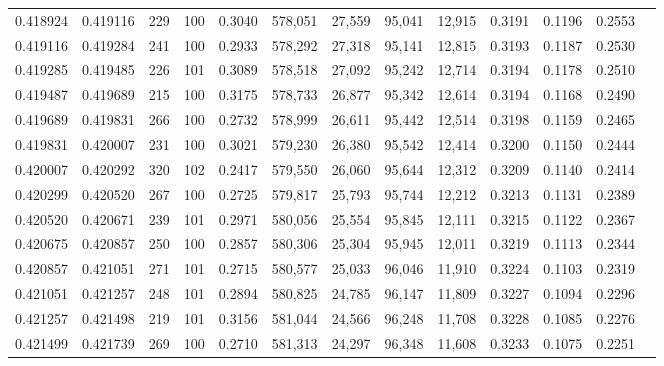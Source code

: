 \begin{tabular}{rrrrrrrrrrrrr}
0.418924 & 0.419116 &   229 & 100 &                                     0.3040 & 578,051 &  27,559 &  95,041 &  12,915 & 0.3191 & 0.1196 & 0.2553 \\
0.419116 & 0.419284 &   241 & 100 &                                     0.2933 & 578,292 &  27,318 &  95,141 &  12,815 & 0.3193 & 0.1187 & 0.2530 \\
0.419285 & 0.419485 &   226 & 101 &                                     0.3089 & 578,518 &  27,092 &  95,242 &  12,714 & 0.3194 & 0.1178 & 0.2510 \\
0.419487 & 0.419689 &   215 & 100 &                                     0.3175 & 578,733 &  26,877 &  95,342 &  12,614 & 0.3194 & 0.1168 & 0.2490 \\
0.419689 & 0.419831 &   266 & 100 &                                     0.2732 & 578,999 &  26,611 &  95,442 &  12,514 & 0.3198 & 0.1159 & 0.2465 \\
0.419831 & 0.420007 &   231 & 100 &                                     0.3021 & 579,230 &  26,380 &  95,542 &  12,414 & 0.3200 & 0.1150 & 0.2444 \\
0.420007 & 0.420292 &   320 & 102 &                                     0.2417 & 579,550 &  26,060 &  95,644 &  12,312 & 0.3209 & 0.1140 & 0.2414 \\
0.420299 & 0.420520 &   267 & 100 &                                     0.2725 & 579,817 &  25,793 &  95,744 &  12,212 & 0.3213 & 0.1131 & 0.2389 \\
0.420520 & 0.420671 &   239 & 101 &                                     0.2971 & 580,056 &  25,554 &  95,845 &  12,111 & 0.3215 & 0.1122 & 0.2367 \\
0.420675 & 0.420857 &   250 & 100 &                                     0.2857 & 580,306 &  25,304 &  95,945 &  12,011 & 0.3219 & 0.1113 & 0.2344 \\
0.420857 & 0.421051 &   271 & 101 &                                     0.2715 & 580,577 &  25,033 &  96,046 &  11,910 & 0.3224 & 0.1103 & 0.2319 \\
0.421051 & 0.421257 &   248 & 101 &                                     0.2894 & 580,825 &  24,785 &  96,147 &  11,809 & 0.3227 & 0.1094 & 0.2296 \\
0.421257 & 0.421498 &   219 & 101 &                                     0.3156 & 581,044 &  24,566 &  96,248 &  11,708 & 0.3228 & 0.1085 & 0.2276 \\
0.421499 & 0.421739 &   269 & 100 &                                     0.2710 & 581,313 &  24,297 &  96,348 &  11,608 & 0.3233 & 0.1075 & 0.2251 \\

\end{tabular}
